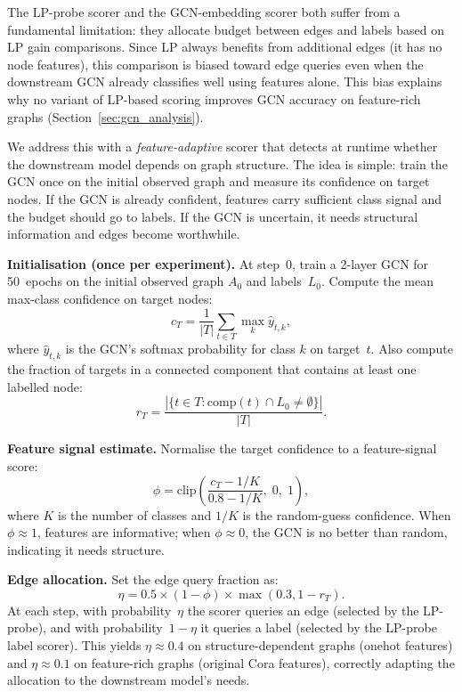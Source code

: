 \documentclass[12pt,a4paper,oneside]{report}
\begin{document}
The LP-probe scorer and the GCN-embedding scorer both suffer from a fundamental limitation: they allocate budget between edges and labels based on LP gain comparisons. Since LP always benefits from additional edges (it has no node features), this comparison is biased toward edge queries even when the downstream GCN already classifies well using features alone. This bias explains why no variant of LP-based scoring improves GCN accuracy on feature-rich graphs (Section~\ref{sec:gcn_analysis}).

We address this with a \emph{feature-adaptive} scorer that detects at runtime whether the downstream model depends on graph structure. The idea is simple: train the GCN once on the initial observed graph and measure its confidence on target nodes. If the GCN is already confident, features carry sufficient class signal and the budget should go to labels. If the GCN is uncertain, it needs structural information and edges become worthwhile.

\textbf{Initialisation (once per experiment).} At step~0, train a 2-layer GCN for 50~epochs on the initial observed graph $A_0$ and labels~$L_0$. Compute the mean max-class confidence on target nodes:
\begin{equation}
    c_T = \frac{1}{|T|} \sum_{t \in T} \max_k \hat{y}_{t,k},
\end{equation}
where $\hat{y}_{t,k}$ is the GCN's softmax probability for class $k$ on target~$t$. Also compute the fraction of targets in a connected component that contains at least one labelled node:
\begin{equation}
    r_T = \frac{|\{t \in T : \text{comp}(t) \cap L_0 \neq \emptyset\}|}{|T|}.
\end{equation}

\textbf{Feature signal estimate.} Normalise the target confidence to a feature-signal score:
\begin{equation}
    \phi = \text{clip}\!\left(\frac{c_T - 1/K}{0.8 - 1/K},\; 0,\; 1\right),
\end{equation}
where $K$ is the number of classes and $1/K$ is the random-guess confidence. When $\phi \approx 1$, features are informative; when $\phi \approx 0$, the GCN is no better than random, indicating it needs structure.

\textbf{Edge allocation.} Set the edge query fraction as:
\begin{equation}
    \eta = 0.5 \times (1 - \phi) \times \max(0.3, 1 - r_T).
\end{equation}
At each step, with probability~$\eta$ the scorer queries an edge (selected by the LP-probe), and with probability~$1 - \eta$ it queries a label (selected by the LP-probe label scorer). This yields $\eta \approx 0.4$ on structure-dependent graphs (onehot features) and $\eta \approx 0.1$ on feature-rich graphs (original Cora features), correctly adapting the allocation to the downstream model's needs.
\end{document}
